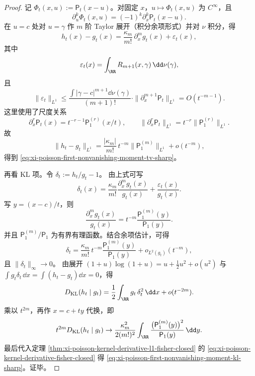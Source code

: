 \begin{proof}
记 \(\Phi_t(x,u):=\mathsf P_t(x-u)\)。对固定 \(x\)，\(u\mapsto \Phi_t(x,u)\) 为 \(C^\infty\)，且
\[
\partial_u^k\Phi_t(x,u)=(-1)^k\partial_x^k\mathsf P_t(x-u).
\]
在 \(u=c\) 处对 \(u=\gamma\) 作 \(m\) 阶 Taylor 展开（积分余项形式）并对 \(\nu\) 积分，得
\[
h_t(x)-g_t(x)=\frac{\kappa_m}{m!}\,\partial_x^m g_t(x)+\varepsilon_t(x),
\]
其中
\[
\varepsilon_t(x)
=\int_{\RR}R_{m+1}(x,\gamma)\,\dd\nu(\gamma),
\]
且
\[
\|\varepsilon_t\|_{L^1}
\le
\frac{\int |\gamma-c|^{m+1}\dd\nu(\gamma)}{(m+1)!}
\cdot
\|\partial_x^{m+1}\mathsf P_t\|_{L^1}
=O(t^{-m-1}).
\]
这里使用了尺度关系
\[
\partial_x^r\mathsf P_t(x)=t^{-r-1}\mathsf P_1^{(r)}(x/t),
\qquad
\|\partial_x^r\mathsf P_t\|_{L^1}=t^{-r}\|\mathsf P_1^{(r)}\|_{L^1}.
\]
故
\[
\|h_t-g_t\|_{L^1}
=\frac{|\kappa_m|}{m!}\,t^{-m}\|\mathsf P_1^{(m)}\|_{L^1}+o(t^{-m}),
\]
得到 \eqref{eq:xi-poisson-first-nonvanishing-moment-tv-sharp}。

再看 KL 项。令
\(
\delta_t:=h_t/g_t-1
\)。
由上式可写
\[
\delta_t(x)
=\frac{\kappa_m}{m!}\frac{\partial_x^m g_t(x)}{g_t(x)}+\frac{\varepsilon_t(x)}{g_t(x)}.
\]
写 \(y=(x-c)/t\)，则
\[
\frac{\partial_x^m g_t(x)}{g_t(x)}
=t^{-m}\frac{\mathsf P_1^{(m)}(y)}{\mathsf P_1(y)}.
\]
并且 \(\mathsf P_1^{(m)}/\mathsf P_1\) 为有界有理函数。结合余项估计，可得
\[
\delta_t
=\frac{\kappa_m}{m!}\,t^{-m}\frac{\mathsf P_1^{(m)}(y)}{\mathsf P_1(y)}
+o_{L^2(g_t)}(t^{-m}),
\]
且 \(\|\delta_t\|_\infty\to 0\)。
由展开
\(
(1+u)\log(1+u)=u+\frac12u^2+o(u^2)
\)
与
\(
\int g_t\delta_t\,\dd x=\int(h_t-g_t)\dd x=0
\)，得
\[
D_{\mathrm{KL}}(h_t\mid g_t)
=\frac12\int_{\RR}g_t\,\delta_t^2\,\dd x+o(t^{-2m}).
\]
乘以 \(t^{2m}\)，再作 \(x=c+ty\) 代换，即
\[
t^{2m}D_{\mathrm{KL}}(h_t\mid g_t)
\to
\frac{\kappa_m^2}{2(m!)^2}
\int_{\RR}\frac{\bigl(\mathsf P_1^{(m)}(y)\bigr)^2}{\mathsf P_1(y)}\,\dd y.
\]
最后代入定理
\ref{thm:xi-poisson-kernel-derivative-l1-fisher-closed}
的 \eqref{eq:xi-poisson-kernel-derivative-fisher-closed} 得
\eqref{eq:xi-poisson-first-nonvanishing-moment-kl-sharp}。证毕。
\end{proof}

